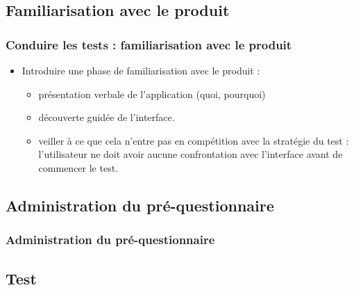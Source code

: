 		\subsection{Familiarisation avec le produit} 
		
		\begin{frame}[allowframebreaks]
		\frametitle{Conduire les tests : familiarisation avec le produit }
					\begin {itemize}
				      \item Introduire une phase de familiarisation avec le produit :  
				      		\begin {itemize}
						\item présentation verbale de l'application (quoi, pourquoi) 
						\item découverte guidée de l'interface.
						\item veiller à ce que cela n'entre pas en compétition avec la stratégie du test : l'utilisateur ne doit avoir aucune confrontation avec l'interface avant de commencer le test. 
						\end{itemize}
					\end{itemize}
		\end{frame}   	
		
		\subsection{Administration du pré-questionnaire} 
		\begin{frame}
		\frametitle{Administration du pré-questionnaire}
					
		\end{frame}  
		
		 \subsection{Test} 
		

